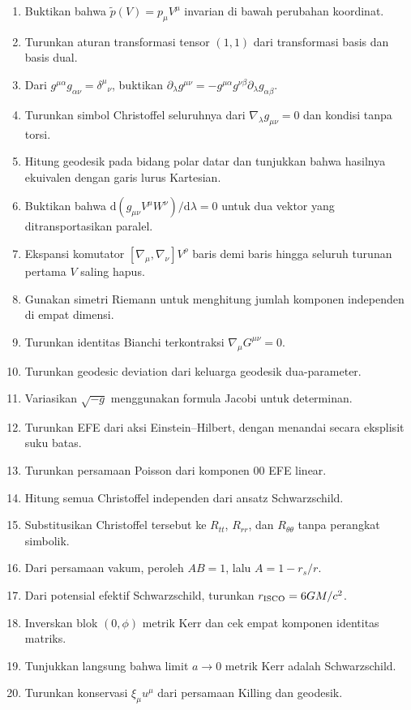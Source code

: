 \documentclass[12pt,a4paper]{report}
\newcommand{\dd}{\mathrm{d}}
\newcommand{\pd}{\partial}
\newcommand{\oneformp}{\widetilde{p}}
\begin{document}
\begin{enumerate}[label=\arabic*.]
 \item Buktikan bahwa $\oneformp(V)=p_\mu V^\mu$ invarian di bawah perubahan koordinat.
 \item Turunkan aturan transformasi tensor $(1,1)$ dari transformasi basis dan basis dual.
 \item Dari $g^{\mu\alpha}g_{\alpha\nu}=\delta^\mu{}_\nu$, buktikan
 $\pd_\lambda g^{\mu\nu}=-g^{\mu\alpha}g^{\nu\beta}\pd_\lambda g_{\alpha\beta}$.
 \item Turunkan simbol Christoffel seluruhnya dari $\nabla_\lambda g_{\mu\nu}=0$
 dan kondisi tanpa torsi.
 \item Hitung geodesik pada bidang polar datar dan tunjukkan bahwa hasilnya ekuivalen
 dengan garis lurus Kartesian.
 \item Buktikan bahwa $\dd(g_{\mu\nu}V^\mu W^\nu)/\dd\lambda=0$ untuk dua vektor
 yang ditransportasikan paralel.
 \item Ekspansi komutator $[\nabla_\mu,\nabla_\nu]V^\rho$ baris demi baris hingga
 seluruh turunan pertama $V$ saling hapus.
 \item Gunakan simetri Riemann untuk menghitung jumlah komponen independen di empat dimensi.
 \item Turunkan identitas Bianchi terkontraksi $\nabla_\mu G^{\mu\nu}=0$.
 \item Turunkan geodesic deviation dari keluarga geodesik dua-parameter.
 \item Variasikan $\sqrt{-g}$ menggunakan formula Jacobi untuk determinan.
 \item Turunkan EFE dari aksi Einstein--Hilbert, dengan menandai secara eksplisit
 suku batas.
 \item Turunkan persamaan Poisson dari komponen $00$ EFE linear.
 \item Hitung semua Christoffel independen dari ansatz Schwarzschild.
 \item Substitusikan Christoffel tersebut ke $R_{tt}$, $R_{rr}$, dan
 $R_{\theta\theta}$ tanpa perangkat simbolik.
 \item Dari persamaan vakum, peroleh $AB=1$, lalu $A=1-r_s/r$.
 \item Dari potensial efektif Schwarzschild, turunkan $r_{\rm ISCO}=6GM/c^2$.
 \item Inverskan blok $(0,\phi)$ metrik Kerr dan cek empat komponen identitas matriks.
 \item Tunjukkan langsung bahwa limit $a\to0$ metrik Kerr adalah Schwarzschild.
 \item Turunkan konservasi $\xi_\mu u^\mu$ dari persamaan Killing dan geodesik.

\end{enumerate}
\end{document}
